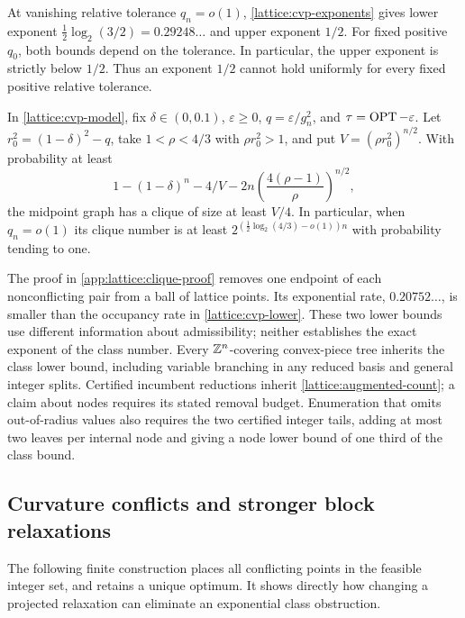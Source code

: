 At vanishing relative tolerance $q_n=o(1)$,
\eqref{lattice:cvp-exponents} gives lower exponent
$\tfrac12\log_2(3/2)=0.29248\ldots$ and upper exponent $1/2$.
For fixed positive $q_0$, both bounds depend on the tolerance. In
particular, the upper exponent is strictly below $1/2$. Thus an exponent
$1/2$ cannot hold uniformly for every fixed positive relative tolerance.

\begin{proposition}
\label{lattice:cvp-clique}
In \eqref{lattice:cvp-model}, fix $\delta\in(0,0.1)$,
$\varepsilon\ge0$, $q=\varepsilon/g_n^2$, and
$\tau=\operatorname{OPT}-\varepsilon$. Let $r_0^2=(1-\delta)^2-q$, take $1<\rho<4/3$ with
$\rho r_0^2>1$, and put $V=(\rho r_0^2)^{n/2}$. With probability at least
\begin{equation*}
 1-(1-\delta)^n-4/V
   -2n\left(\frac{4(\rho-1)}\rho\right)^{n/2},
\end{equation*}
the midpoint graph has a clique of size at least $V/4$. In particular, when
$q_n=o(1)$ its clique number is at least
$2^{(\frac12\log_2(4/3)-o(1))n}$ with probability tending to one.
\end{proposition}

The proof in \cref{app:lattice:clique-proof} removes one endpoint of each
nonconflicting pair from a ball of lattice points. Its exponential rate,
$0.20752\ldots$, is smaller than the occupancy rate in
\eqref{lattice:cvp-lower}. These two lower bounds use different information
about admissibility; neither establishes the exact exponent of the class
number. Every $\mathbb{Z}^n$-covering convex-piece tree inherits the class lower
bound, including variable branching in any reduced basis and general
integer splits. Certified incumbent reductions inherit
\eqref{lattice:augmented-count}; a claim about nodes requires its stated
removal budget. Enumeration that omits out-of-radius values also requires
the two certified integer tails, adding at most two leaves per internal
node and giving a node lower bound of one third of the class bound.

\subsection{Curvature conflicts and stronger block relaxations}

The following finite construction places all conflicting points in the
feasible integer set, and retains a unique optimum. It shows directly how
changing a projected relaxation can eliminate an exponential class
obstruction.

